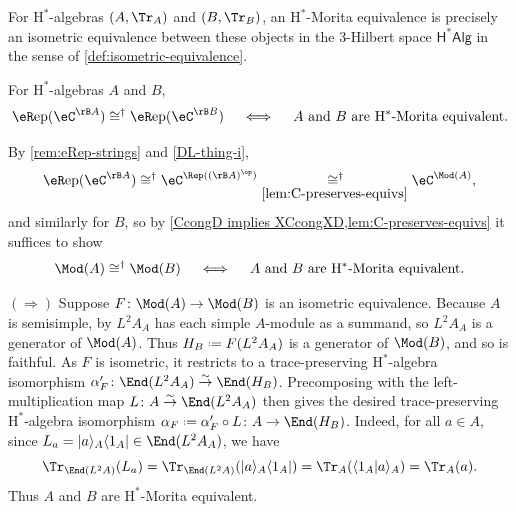 \documentclass[12pt,reqno]{amsart}
\newcounter{alpha}\renewcommand\thealpha{\upshape\Alph{alpha}}
\newcommand{\eRep}{{\eR}\mathrm{ep}}
\newcommand{\C}{\eC}
\newcommand{\bra}[1]{\langle#1\rvert}
\newcommand{\ket}[1]{\lvert#1\rangle}
\newcommand{\bkt}[2]{\langle #1|#2 \rangle}
\newcommand{\Hstar}{\ensuremath{\mathrm{H}^{*}}}
\newcommand{\itemstep}[1]{\smallskip\noindent\underline{#1}}
\DeclareRobustCommand{\coloneq}{\mathrel{\vcenter{\baselineskip0.5ex\lineskiplimit0pt\hbox{\scriptsize{\upshape.}}\hbox{\scriptsize{\upshape.}}}}=}
\begin{document}
\begin{remark} 
For $\Hstar$-algebras $(A, \Tr_A)$ and $(B, \Tr_B)$, an $\Hstar$-Morita equivalence is precisely an isometric equivalence between these objects in the 3-Hilbert space $\mathsf{H^*Alg}$ in the sense of \cref{def:isometric-equivalence}. 
\end{remark}

\begin{proposition}\label{lem:hstar-morita-rep}
\label{precprop}
For $\Hstar$-algebras $A$ and $B$,
\[
\eRep(\C^{\rB A}) \cong^\dag \eRep(\C^{\rB B})
\quad\iff\quad
A \text{ and } B \text{ are } \Hstar\text{-Morita equivalent}.
\]
\end{proposition}

\begin{pf}
By \cref{rem:eRep-strings} and \cref{DL-thing-i},
\[
\eRep(\C^{\rB A})
\cong^{\dag}
\C^{\Rep((\rB A)^\op)}
\underset{\eqref{lem:C-preserves-equivs}}{\,\cong^\dag}
\C^{\Mod(A)},
\]
and similarly for $B$, so by
\cref{CcongD implies XCcongXD,lem:C-preserves-equivs} it suffices to show
\[
\Mod(A)\cong^{\dag} \Mod(B)
\quad
\iff
\quad
A \text{ and } B \text{ are } \Hstar\text{-Morita equivalent.}
\]

\itemstep{$(\Rightarrow)$} Suppose $F\colon \Mod(A) \to \Mod(B)$ is an isometric equivalence. Because $A$ is semisimple, by \cite[\S I.2.2]{UQSL} $L^2A_A$ has each simple $A$-module as a summand, so $L^2A_A$ is a generator of $\Mod(A)$. Thus $H_B \coloneq F(L^2A_A)$ is a generator of $\Mod(B)$, and so is faithful. As $F$ is isometric, it restricts to a trace-preserving $\Hstar$-algebra isomorphism $\alpha'_F \colon \End(L^2A_A) \overset\sim\to\End(H_B)$. Precomposing with the left-multiplication map $L\colon A \overset\sim\to \End(L^2A_A)$ then gives the desired trace-preserving $\Hstar$-algebra isomorphism $\alpha_F \coloneq \alpha'_F \circ L \colon A \to \End(H_B)$. Indeed, for all $a \in A$, since $L_a = \ket{a}_A\bra{1_A} \in \End(L^2A_A)$, we have
\[
\Tr_{\End(L^2A)}(L_a)
= \Tr_{\End(L^2A)}(\ket{a}_A\bra{1_A})
= \Tr_A(\bkt{1_A}{a}_A)
= \Tr_A(a).
\]
Thus $A$ and $B$ are $\Hstar$-Morita equivalent.


\end{pf}
\end{document}
